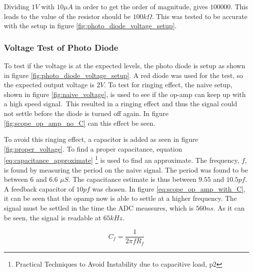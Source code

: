 Dividing $1 V$ with $10 \mu A$ in order to get the order of magnitude, gives $100 000$. This leads to the value of the resistor should be $100 k\Omega$.
This was tested to be accurate with the setup in figure \ref{fig:photo_diode_voltage_setup}.

\subsubsection{Voltage Test of Photo Diode}

To test if the voltage is at the expected levels, the photo diode is setup as shown in figure \ref{fig:photo_diode_voltage_setup}.
A red diode was used for the test, so the expected output voltage is $2 V$.
To test for ringing effect, the naive setup, shown in figure \ref{fig:naive_voltage}, 
is used to see if the op-amp can keep up with a high speed signal.\
This resulted in a ringing effect and thus the signal could not settle before the diode is turned off again.
In figure \ref{fig:scope_op_amp_no_C} can this effect be seen.

To avoid this ringing effect, a capacitor is added as seen in figure \ref{fig:proper_voltage}.
To find a proper capacitance, equation \ref{eq:capacitance_approximate}
\footnote{Practical Techniques to Avoid Instability due to capacitive load, p2}
is used to find an approximate.
The frequency, $f$, is found by measuring the period on the naive signal.
The period was found to be between $6$ and $6.6$ $\mu S$.
The capacitance estimate is thus between $9.55$ and $10.5 pf$. 
A feedback capacitor of $10 pf$ was chosen.
In figure \ref{eq:scope_op_amp_with_C}, it can be seen that the opamp now is able to settle at a higher frequency.
The signal must be settled in the time the ADC meassures, which is $560 ns$.
As it can be seen, the signal is readable at $65 kHz$.

\begin{equation}
 C_f = \frac{1}{2 \pi f R_f} \label{eq:capacitance_approximate}
\end{equation}


